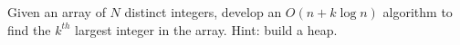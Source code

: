 Given an array of $N$ distinct integers, develop an $O(n+k\log  n)$
algorithm to find the $k^{th}$ largest integer in the array.  Hint: build
a heap.

